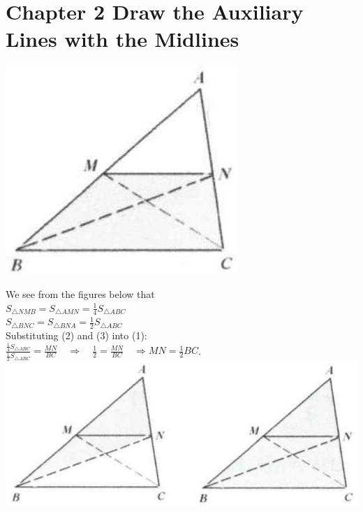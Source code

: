 \documentclass[10pt]{article}
\begin{document}
\section*{Chapter 2 Draw the Auxiliary Lines with the Midlines}
\begin{center}
\includegraphics[max width=\textwidth]{2025_04_17_97bc1f7e44d93c271a88g-033}
\end{center}

We see from the figures below that\\
\(S_{\triangle N M B}=S_{\triangle A M N}=\frac{1}{4} S_{\triangle A B C}\)\\
\(S_{\triangle B N C}=S_{\triangle B N A}=\frac{1}{2} S_{\triangle A B C}\)\\
Substituting (2) and (3) into (1):\\
\(\frac{\frac{1}{4} S_{\triangle A B C}}{\frac{1}{2} S_{\triangle A B C}}=\frac{M N}{B C} \quad \Rightarrow \quad \frac{1}{2}=\frac{M N}{B C} \quad \Rightarrow M N=\frac{1}{2} B C\).\\
\includegraphics[max width=\textwidth, center]{2025_04_17_97bc1f7e44d93c271a88g-033(2)}
\end{document}
